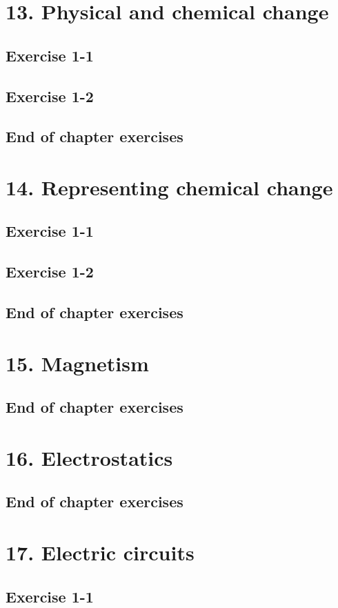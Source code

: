 \section{13. Physical and chemical change}
\subsection{Exercise 1-1}
\subsection{Exercise 1-2}
\subsection{End of chapter exercises}
\section{14. Representing chemical change}
\subsection{Exercise 1-1}
\subsection{Exercise 1-2}
\subsection{End of chapter exercises}
\section{15. Magnetism}
\subsection{End of chapter exercises}
\section{16. Electrostatics}
\subsection{End of chapter exercises}
\section{17. Electric circuits}
\subsection{Exercise 1-1}
